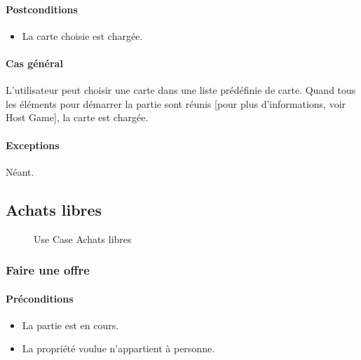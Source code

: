 \documentclass[a4paper,11pt]{report}
\begin{document}
\paragraph{Postconditions}
\begin{itemize}
 \item La carte choisie est chargée.
\end{itemize}
\paragraph{Cas général}
L'utilisateur peut choisir une carte dans une liste prédéfinie de carte. Quand tous les éléments pour démarrer la partie
sont réunis [pour plus d'informations, voir Host Game], la carte est chargée.
\paragraph{Exceptions} Néant.

\newpage
\subsection{Achats libres}
\begin{figure}[ht]
    \caption{Use Case Achats libres}
\end{figure}
\subsubsection{Faire une offre}
\paragraph{Préconditions}
\begin{itemize}
 \item La partie est en cours.
 \item La propriété voulue n'appartient à personne.
\end{itemize}
\end{document}
